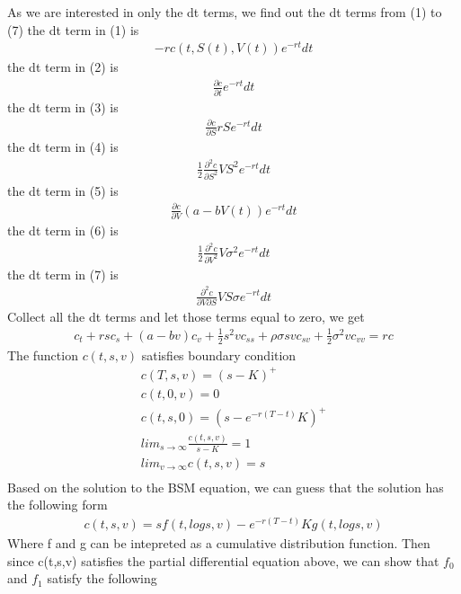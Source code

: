 \documentclass[a4paper]{article}
\begin{document}
As we are interested in only the dt terms, we find out the dt terms from (1) to (7)
the dt term in (1) is
\begin{align*}
	-rc(t, S(t), V(t))e^{-rt}dt
\end{align*}
the dt term in (2) is
\begin{align*}
	\frac{\partial c}{\partial t}e^{-rt}dt
\end{align*}
the dt term in (3) is
\begin{align*}
	\frac{\partial c}{\partial S}rSe^{-rt}dt
\end{align*}
the dt term in (4) is
\begin{align*}
	\frac{1}{2} \frac{\partial^2 c}{\partial S^2}VS^2e^{-rt}dt
\end{align*}
the dt term in (5) is
\begin{align*}
	\frac{\partial c}{\partial V}(a-bV(t))e^{-rt}dt
\end{align*}
the dt term in (6) is
\begin{align*}
	\frac{1}{2} \frac{\partial^2 c}{\partial V^2}V\sigma^2e^{-rt}dt
\end{align*}
the dt term in (7) is
\begin{align*}
	\frac{\partial^2 c}{\partial V \partial S} VS\sigma e^{-rt}dt
\end{align*}
Collect all the dt terms and let those terms equal to zero, we get
\begin{align*}
	c_t + rs c_s + (a-bv)c_v + \frac{1}{2} s^2 v c_{ss} + \rho \sigma svc_{sv}
	+\frac{1}{2} \sigma^2vc_{vv} = rc
\end{align*}
The function $c(t, s, v)$ satisfies boundary condition
\begin{align*}
	c(T, s, v) = (s-K)^+ \\
	c(t, 0, v) = 0 \\
	c(t, s, 0) = (s - e^{-r(T-t)}K)^+\\
	lim_{s \to \infty} \frac{c(t, s, v)}{s-K} = 1 \\
	lim_{v \to \infty} c(t, s, v) = s\\  
\end{align*}
Based on the solution to the BSM equation, we can guess that the solution has the following form
\begin{align*}
	c(t,s,v) = sf(t, logs, v) - e^{-r(T-t)}Kg(t,logs,v)
\end{align*}	
Where f and g can be intepreted as a cumulative distribution function.
Then since c(t,s,v) satisfies the partial differential equation above, we can show that $f_0$ and $f_1$ satisfy the following
\end{document}
